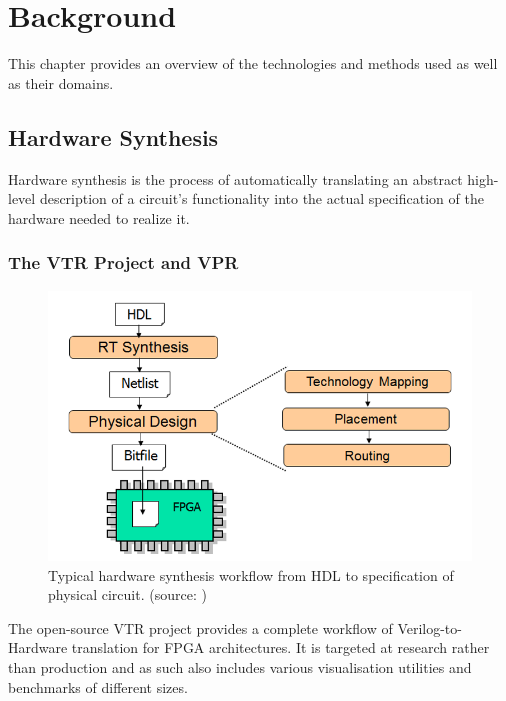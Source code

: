 
\chapter{Background}\label{ch:relatedwork}
\glsresetall %

This chapter provides an overview of the technologies and methods used as well as their domains.

\section{Hardware Synthesis}

Hardware synthesis is the process of automatically translating an abstract high-level description of a circuit's functionality into the actual specification of the hardware needed to realize it.

\subsection{The VTR Project and VPR}

\begin{figure}
	\includegraphics[width=\linewidth]{plots/hardware-synthesis.png}
	\caption{Typical hardware synthesis workflow from \gls{HDL} to specification of physical circuit. (source: \cite{hardware-synthesis-plot})}
	\label{fig:hardware-synthesis}
\end{figure}

The open-source \gls{VTR} project\cite{vtr8} provides a complete workflow of Verilog-to-Hardware translation for \newline\noindent\gls{FPGA} architectures. It is targeted at research rather than production and as such also includes various visualisation utilities and benchmarks of different sizes.

